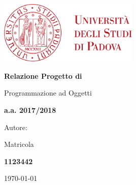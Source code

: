 \begin{titlepage} 
	\centering
	\includegraphics[width=0.50\textwidth]{img/logo.pdf}\par\vspace{1cm} %
	
	{\LARGE\bfseries Relazione Progetto di \par Programmazione ad Oggetti \par}
	\vspace{1cm}
	
	{\Large\bfseries a.a. 2017/2018 \par}
	
	\vspace{1cm} 

	Autore: \par
    {\bfseries \authorName \par} 
    Matricola {\bfseries 1123442 \par} 
	
	\vspace{1cm}

    
    \vfill
	
	{\large \today\par}
	
\end{titlepage}